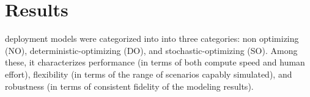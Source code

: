 \section{Results}
deployment models were categorized into into three categories: non optimizing 
(NO), deterministic-optimizing (DO), and stochastic-optimizing (SO). Among 
these, it characterizes performance (in terms of both compute speed and human 
effort), flexibility (in terms of the range of scenarios capably simulated), 
and robustness (in terms of consistent fidelity of the modeling results).


